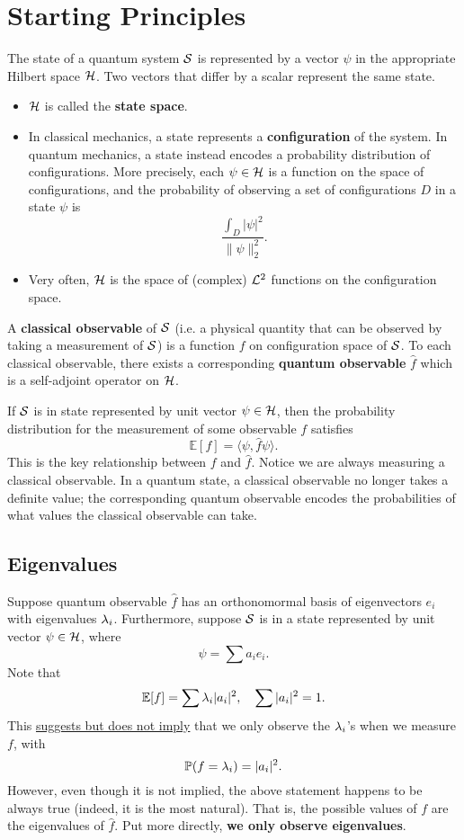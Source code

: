 \section{Starting Principles}

The state of a quantum system ${\mathcal S}$ is represented by a vector $\psi$ in the appropriate Hilbert space ${\mathcal H}$. Two vectors that differ by a scalar represent the same state.
\begin{itemize}
    \item ${\mathcal H}$ is called the \textbf{state space}.
    \item In classical mechanics, a state represents a \textbf{configuration} of the system. In quantum mechanics, a state instead encodes a probability distribution of configurations. More precisely, each $\psi \in {\mathcal H}$ is a function on the space of configurations, and the probability of observing a set of configurations $D$ in a state $\psi$ is
    \[
        \frac{\int_D |\psi|^2}{\|\psi\|_2^2}.
    \]
    \item Very often, ${\mathcal H}$ is the space of (complex) ${\mathcal L}^2$ functions on the configuration space.
\end{itemize}

A \textbf{classical observable} of ${\mathcal S}$ (i.e. a physical quantity that can be observed by taking a measurement of ${\mathcal S}$) is a function $f$ on configuration space of ${\mathcal S}$. To each classical observable, there exists a corresponding \textbf{quantum observable} $\hat{f}$ which is a self-adjoint operator on ${\mathcal H}$.

If ${\mathcal S}$ is in state represented by unit vector $\psi \in {\mathcal H}$, then the probability distribution for the measurement of some observable $f$ satisfies
\[
    \mathbb E[f] = \langle \psi, \hat{f} \psi \rangle.
\]
This is the key relationship between $f$ and $\hat{f}$. Notice we are always measuring a classical observable. In a quantum state, a classical observable no longer takes a definite value; the corresponding quantum observable encodes the probabilities of what values the classical observable can take.

\subsection{Eigenvalues}

Suppose quantum observable $\hat{f}$ has an orthonomormal basis of eigenvectors $e_i$ with eigenvalues $\lambda_i$. Furthermore, suppose ${\mathcal S}$ is in a state represented by unit vector $\psi \in {\mathcal H}$, where
\[
    \psi = \sum a_i e_i.
\]
Note that
\[
    \mathbb E[f] = \sum \lambda_i |a_i|^2, \quad \sum |a_i|^2 = 1.
\]
This \underline{suggests but does not imply} that we only observe the $\lambda_i$'s when we measure $f$, with
\[
    \mathbb P(f = \lambda_i) = |a_i|^2.
\]
However, even though it is not implied, the above statement happens to be always true (indeed, it is the most natural). That is, the possible values of $f$ are the eigenvalues of $\hat{f}$. Put more directly, \textbf{we only observe eigenvalues}.

